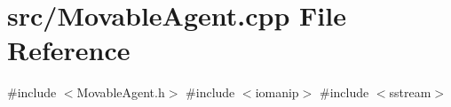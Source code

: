\section{src/\+Movable\+Agent.cpp File Reference}
\label{_movable_agent_8cpp}
{\ttfamily \#include $<$Movable\+Agent.\+h$>$}\newline
{\ttfamily \#include $<$iomanip$>$}\newline
{\ttfamily \#include $<$sstream$>$}\newline
